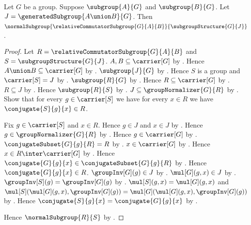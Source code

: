 \begin{theorem}\label{relative_commutator_normal_in_generated_join}
    Let $G$ be a group.
    Suppose $\subgroup{A}{G}$ and $\subgroup{B}{G}$.
    Let $J=\generatedSubgroup{A\union B}{G}$.
    Then
        $\normalSubgroup
            {\relativeCommutatorSubgroup{G}{A}{B}}
            {\subgroupStructure{G}{J}}$.
\end{theorem}
\begin{proof}
    Let $R=\relativeCommutatorSubgroup{G}{A}{B}$ and
        $S=\subgroupStructure{G}{J}$.
    $A,B\subseteq\carrier[G]$ by .
    Hence $A\union B\subseteq\carrier[G]$ by
        .
    $\subgroup{J}{G}$ by .
    Hence $S$ is a group and $\carrier[S]=J$ by
        .
    $\subgroup{R}{G}$ by
        .
    Hence $R\subseteq\carrier[G]$ by .
    $R\subseteq J$ by
        .
    Hence $\subgroup{R}{S}$ by
        .
    $J\subseteq\groupNormalizer{G}{R}$ by
        .
    Show that for every $g\in\carrier[S]$ we have for every $x\in R$
        we have $\conjugate{S}{g}{x}\in R$.
    \begin{subproof}
        Fix $g\in\carrier[S]$ and $x\in R$.
        Hence $g\in J$ and $x\in J$ by .
        Hence $g\in\groupNormalizer{G}{R}$ by .
        Hence $g\in\carrier[G]$ by .
        $\conjugateSubset{G}{g}{R}=R$ by
            .
        $x\in\carrier[G]$ by .
        Hence $x\in R\inter\carrier[G]$ by .
        Hence $\conjugate{G}{g}{x}\in
            \conjugateSubset{G}{g}{R}$ by
            .
        Hence $\conjugate{G}{g}{x}\in R$.
        $\groupInv[G](g)\in J$ by .
        $\mul[G](g,x)\in J$ by .
        $\groupInv[S](g)=\groupInv[G](g)$ by
            .
        $\mul[S](g,x)=\mul[G](g,x)$ and
            $\mul[S](\mul[G](g,x),\groupInv[G](g))=
                \mul[G](\mul[G](g,x),\groupInv[G](g))$ by
            .
        Hence $\conjugate{S}{g}{x}=\conjugate{G}{g}{x}$ by
            .
    \end{subproof}
    Hence $\normalSubgroup{R}{S}$ by
        .
\end{proof}

